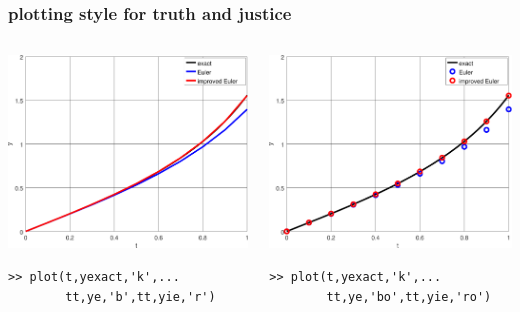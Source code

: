 \documentclass[urlcolor=blue,dvipsnames]{beamer}
\begin{document}
\begin{frame}[fragile]
\frametitle{plotting style for truth and justice}

\begin{columns}
\begin{column}{0.5\textwidth}
\includegraphics[width=\textwidth]{figs/badstyle}

\begin{Verbatim}[fontsize=\scriptsize]
>> plot(t,yexact,'k',...
        tt,ye,'b',tt,yie,'r')
\end{Verbatim}
\end{column}
\begin{column}{0.5\textwidth}
\includegraphics[width=\textwidth]{figs/goodstyle}

\begin{Verbatim}[fontsize=\scriptsize]
>> plot(t,yexact,'k',...
        tt,ye,'bo',tt,yie,'ro')
\end{Verbatim}
\end{column}
\end{columns}
\end{frame}
\end{document}
